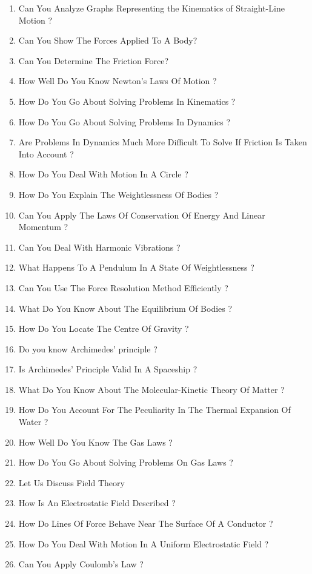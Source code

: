 \begin{enumerate}[nosep]
  \item Can You Analyze Graphs Representing the Kinematics of Straight-Line Motion ?
  \item Can You Show The Forces Applied To A Body?
  \item Can You Determine The Friction Force?
  \item How Well Do You Know Newton’s Laws Of Motion ?
  \item How Do You Go About Solving Problems In Kinematics ?
  \item How Do You Go About Solving Problems In Dynamics ?
  \item Are Problems In Dynamics Much More Difficult To Solve If Friction Is Taken Into Account ?
  \item How Do You Deal With Motion In A Circle ?
  \item How Do You Explain The Weightlessness Of Bodies ?
  \item Can You Apply The Laws Of Conservation Of Energy And Linear Momentum ?
  \item Can You Deal With Harmonic Vibrations ?
  \item What Happens To A Pendulum In A State Of Weightlessness ?
  \item Can You Use The Force Resolution Method Efficiently ?
  \item What Do You Know About The Equilibrium Of Bodies ?
  \item How Do You Locate The Centre Of Gravity ?
  \item Do you know Archimedes’ principle ?
  \item Is Archimedes’ Principle Valid In A Spaceship ?
  \item What Do You Know About The Molecular-Kinetic Theory Of Matter ?
  \item How Do You Account For The Peculiarity In The Thermal Expansion Of Water ?
  \item How Well Do You Know The Gas Laws ?
  \item How Do You Go About Solving Problems On Gas Laws ?
  \item Let Us Discuss Field Theory
  \item How Is An Electrostatic Field Described ?
  \item How Do Lines Of Force Behave Near The Surface Of A Conductor ?
  \item How Do You Deal With Motion In A Uniform Electrostatic Field ?
  \item Can You Apply Coulomb’s Law ?

\end{enumerate}
